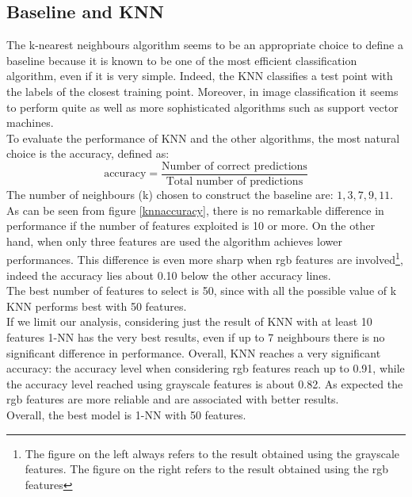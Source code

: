 \documentclass{article}
\begin{document}
\subsection{Baseline and KNN}
The k-nearest neighbours  algorithm seems to be an appropriate choice to define a baseline because it is known to be one of the most efficient classification algorithm, even if it is very simple. Indeed, the KNN classifies a test point with the labels of the closest training point. Moreover, in image classification it seems to perform quite as well as more sophisticated algorithms such as support vector machines. \cite{knnresults} \\
To evaluate the performance of KNN and the other algorithms, the most natural choice is the accuracy, defined as:
\begin{equation}
\text{accuracy}  = \frac{\text{Number of correct predictions}}{ \text{Total number of predictions}}
\end{equation}
\noindent The number of neighbours (k) chosen to construct the baseline are: $1,3,7,9,11$.
As can be seen from figure \ref{knnaccuracy}, there is no remarkable difference in performance if the number of features exploited is 10 or more. On the other hand, when only three features are used the algorithm achieves lower performances. This difference is even more sharp when rgb features are involved\footnote{The figure on the left always refers to the result obtained using the grayscale features. The figure on the right refers to the result obtained using the rgb features}, indeed the accuracy lies about 0.10 below the other accuracy lines.\\
The best number of features to select is 50, since with all the possible value of k KNN performs best with 50 features.\\
If we limit our analysis, considering just the result of KNN with at least 10 features 1-NN has the very best results, even if up to 7 neighbours there is no significant difference in performance.
Overall, KNN reaches a very significant accuracy: the accuracy level when considering rgb features reach up to 0.91, while the accuracy level reached using grayscale features is about 0.82. As expected the rgb features are more reliable and are associated with better results.\\
Overall, the best model is 1-NN with 50 features.
\end{document}
